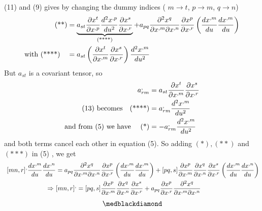 (11) and (9) gives by changing the dummy indices ( $m\rightarrow t$, $p\rightarrow m$, $q\rightarrow n$)
\begin{align}
\text{(**)}&= \underbrace{a_{st}\pdv{x^t}{x^{,p}}\dv[2]{x^{,p}}{u}\pdv{x^s}{x^{,r}}}_\text{(****)}+a_{pq}\pdv{x^q}{x^{,m}}{x^{,n}}\pdv{x^{p}}{x^{,r}}\left(\dv{x^{,m}}{u}\dv{x^{,m}}{u}\right) \\
\text{with (****)}\quad &= a_{st}\left(\pdv{x^t}{x^{,m}}\pdv{x^s}{x^{,r}}\right)\dv[2]{x^{,m}}{u}
\end{align}
But $a_{st}$  is a covariant tensor, so
\begin{align}
\ a^{,}_{rm} &= a_{st}\pdv{x^t}{x^{,m}}\pdv{x^s}{x^{,r}}\\
\text{(13) becomes}\quad \text{(****)} &= a^{,}_{rm}\dv[2]{x^{,m}}{u}\\
\text{and from (5) we have }\quad \text{(*)} &= -a^{,}_{rm}\dv[2]{x^{,m}}{u}\\
\end{align}
and both terms cancel each other in equation (5). So adding $(*), (**)$ and $(***)$ in (5) , we get 
\begin{align}
\ [mn,r]^, \dv{x^{,m}}{u}\dv{x^{,n}}{u} &= a_{pq}\pdv{x^q}{x^{,m}}{x^{,n}}\pdv{x^{p}}{x^{,r}}\left(\dv{x^{,m}}{u}\dv{x^{,m}}{u}\right)+[pq,s]\pdv{x^p}{x^{,m}}\pdv{x^q}{x^{,n}}\pdv{x^s}{x^{,r}}\left(\dv{x^{,m}}{u}\dv{x^{,n}}{u}\right)\\
\Rightarrow \ &[mn,r]^, =[pq,s]\pdv{x^p}{x^{,m}}\pdv{x^q}{x^{,n}}\pdv{x^s}{x^{,r}}+  a_{pq}\pdv{x^{p}}{x^{,r}}\pdv{x^q}{x^{,m}}{x^{,n}}
\end{align}
$$\medblackdiamond$$
\newpage

